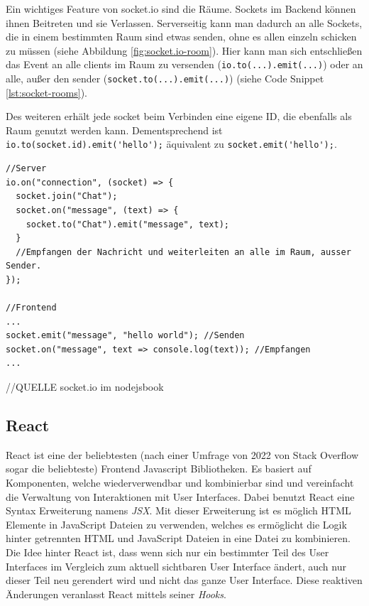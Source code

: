 \documentclass[a4paper,12pt]{report}
\newcommand{\footcite}[1]{\footnotemark\footnotetext{\cite{#1}}}
\begin{document}
Ein wichtiges Feature von socket.io sind die Räume\footcite{socket-rooms}. Sockets im Backend können ihnen Beitreten und sie Verlassen. Serverseitig kann man dadurch an alle Sockets, die in einem bestimmten Raum sind etwas senden, ohne es allen einzeln schicken zu müssen (siehe Abbildung \ref{fig:socket.io-room}). Hier kann man sich entschließen das Event an alle clients im Raum zu versenden (\verb|io.to(...).emit(...)|) oder an alle, außer den sender (\verb|socket.to(...).emit(...)|) (siehe Code Snippet \ref{lst:socket-rooms}).

Des weiteren erhält jede socket beim Verbinden eine eigene ID, die ebenfalls als Raum genutzt werden kann. Dementsprechend ist \verb|io.to(socket.id).emit('hello');| äquivalent zu \verb|socket.emit('hello');|.


\begin{lstlisting}[style=codeStyle, caption={Beispiel zum Beitreten Raums und das senden eines Events in diesen Raum}, label={lst:socket-rooms}]
//Server
io.on("connection", (socket) => {
  socket.join("Chat");
  socket.on("message", (text) => {
  	socket.to("Chat").emit("message", text);
  }
  //Empfangen der Nachricht und weiterleiten an alle im Raum, ausser Sender.
});

//Frontend
...
socket.emit("message", "hello world"); //Senden
socket.on("message", text => console.log(text)); //Empfangen
...
\end{lstlisting}
//QUELLE socket.io im nodejsbook
        \subsection{React}
        \label{sec:react}
React ist eine der beliebtesten (nach einer Umfrage von 2022 von Stack Overflow sogar die beliebteste\footcite{stack-overflow-survey}) Frontend Javascript Bibliotheken. Es basiert auf Komponenten, welche wiederverwendbar und kombinierbar sind und vereinfacht die Verwaltung von Interaktionen mit User Interfaces. Dabei benutzt React eine Syntax Erweiterung namens \textit{JSX}. Mit dieser Erweiterung ist es möglich HTML Elemente in JavaScript Dateien zu verwenden, welches es ermöglicht die Logik hinter getrennten HTML und JavaScript Dateien in eine Datei zu kombinieren. Die Idee hinter React ist, dass wenn sich nur ein bestimmter Teil des User Interfaces im Vergleich zum aktuell sichtbaren User Interface ändert, auch nur dieser Teil neu gerendert wird und nicht das ganze User Interface. Diese reaktiven Änderungen veranlasst React mittels seiner \textit{Hooks}.
\end{document}
